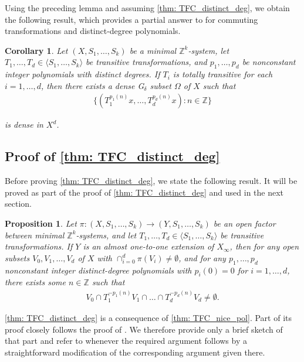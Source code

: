 \documentclass[11pt,reqno]{amsart}
\newcommand{\Z}{\mathbb{Z}}
\newtheorem{proposition}[proposition]{Proposition}
\newtheorem{corollary}[corollary]{Corollary}
\theoremstyle{definition}
\theoremstyle{remark}
\begin{document}
Using the preceding lemma and assuming \cref{thm: TFC_distinct_deg}, we obtain the following result, which provides a partial answer to {\cite[Problem 8]{Koutsogiannis_Kuca_Sun_2_nil_avr_distinct_degree:2026}} for commuting transformations and distinct-degree polynomials.

\begin{corollary}
    Let $(X,S_1,\dots,S_k)$ be a minimal $\Z^k$-system, let $T_1,\dots,T_d\in \langle S_{1},\dots,S_{k}\rangle$ be transitive transformations, and $p_1,\dots,p_d$ be nonconstant integer polynomials with distinct degrees. If $T_i$ is totally transitive for each $i=1,\dots,d$, then there exists a dense G$_\delta$ subset $\Omega$ of $X$ such that \begin{align*}
        \{(T_1^{p_1(n)}x,\dots,T_d^{p_d(n)}x):n\in\Z\}
    \end{align*}

    is dense in $X^d$.
\end{corollary}

\subsection{Proof of \cref{thm: TFC_distinct_deg}}

Before proving \cref{thm: TFC_distinct_deg}, we state the following result. It will be proved as part of the proof of \cref{thm: TFC_distinct_deg} and used in the next section.

\begin{proposition}
    Let $\pi\colon (X,S_1,\dots,S_k) \to (Y,S_1,\dots,S_k)$ be an open factor between minimal $\Z^k$-systems, and let $T_1,\dots,T_d\in \langle S_{1},\dots,S_{k}\rangle$ be transitive transformations. If $Y$ is an almost one-to-one extension of $X_\infty$, then for any open subsets $V_{0},V_{1},\dots,V_{d}$ of $X$ with $\cap_{i=0}^{d}\pi(V_i)\neq \emptyset$, and for any $p_1,\dots,p_d$ nonconstant integer distinct-degree polynomials with $p_{i}(0)=0$ for $i=1,\dots, d$, there exists some $n\in \Z$ such that\begin{align*}
        V_{0} \cap T_{1}^{-p_1(n)}V_{1} \cap \dots\cap T_{d}^{-p_d(n)}V_{d} \neq \emptyset.
    \end{align*}
\end{proposition}

\cref{thm: TFC_distinct_deg} is a consequence of \cref{thm: TFC_nice_pol}. Part of its proof closely follows the proof of {\cite[Theorem A]{Ye_Yu_polynomial_saturation:2025}}. We therefore provide only a brief sketch of that part and refer to \cite{Ye_Yu_polynomial_saturation:2025} whenever the required argument follows by a straightforward modification of the corresponding argument given there.
\end{document}
